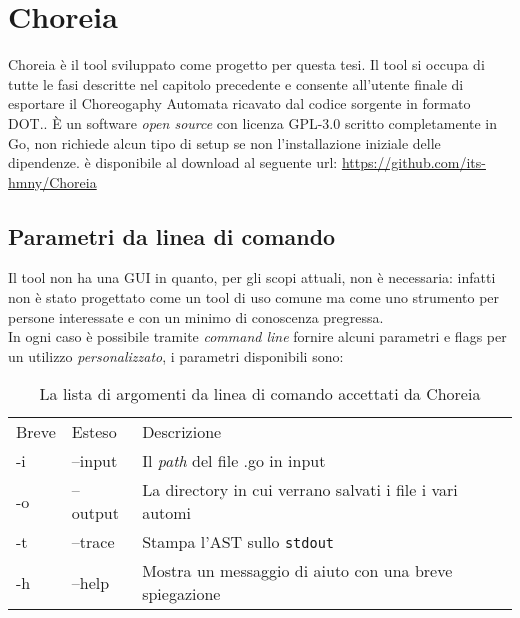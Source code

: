 \chapter{Choreia}
Choreia è il tool sviluppato come progetto per questa tesi. Il tool si occupa di tutte le fasi descritte nel capitolo precedente e consente all'utente finale di esportare il Choreogaphy Automata ricavato dal codice sorgente in formato DOT.. È un software \emph{open source} con licenza GPL-3.0 scritto completamente in Go, non richiede alcun tipo di setup se non l'installazione iniziale delle dipendenze. è disponibile al download al seguente url: \url{https://github.com/its-hmny/Choreia}\\

\section{Parametri da linea di comando}
Il tool non ha una GUI in quanto, per gli scopi attuali, non è necessaria: infatti non è stato progettato come un tool di uso comune ma come uno strumento per persone interessate e con un minimo di conoscenza pregressa.\\
In ogni caso è possibile tramite \emph{command line} fornire alcuni parametri e flags per un utilizzo \emph{personalizzato}, i parametri disponibili sono:
\begin{table}[h!]
    \centering
    \begin{tabular}{l l l}
        Breve & Esteso   & Descrizione                                              \\
        -i    & --input  & Il \emph{path} del file .go in input                     \\
        -o    & --output & La directory in cui verrano salvati i file i vari automi \\
        -t    & --trace  & Stampa l'AST sullo \texttt{stdout}                       \\
        -h    & --help   & Mostra un messaggio di aiuto con una breve spiegazione   \\
    \end{tabular}
    \caption{La lista di argomenti da linea di comando  accettati da Choreia}
\end{table}

